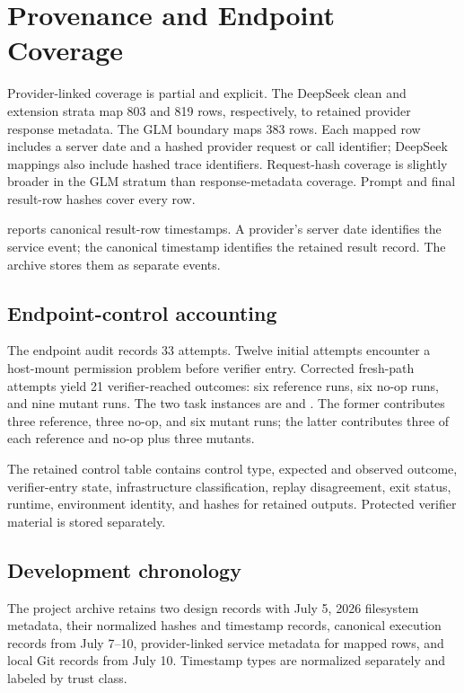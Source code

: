 \section{Provenance and Endpoint Coverage}
\label{app:provenance}



Provider-linked coverage is partial and explicit. The DeepSeek clean and extension strata map 803 and 819 rows, respectively, to retained provider response metadata. The GLM boundary maps 383 rows. Each mapped row includes a server date and a hashed provider request or call identifier; DeepSeek mappings also include hashed trace identifiers. Request-hash coverage is slightly broader in the GLM stratum than response-metadata coverage. Prompt and final result-row hashes cover every row.



 reports canonical result-row timestamps. A provider's server date identifies the service event; the canonical timestamp identifies the retained result record. The archive stores them as separate events.

\subsection{Endpoint-control accounting}

The endpoint audit records 33 attempts. Twelve initial attempts encounter a host-mount permission problem before verifier entry. Corrected fresh-path attempts yield 21 verifier-reached outcomes: six reference runs, six no-op runs, and nine mutant runs. The two task instances are  and . The former contributes three reference, three no-op, and six mutant runs; the latter contributes three of each reference and no-op plus three mutants.

The retained control table contains control type, expected and observed outcome, verifier-entry state, infrastructure classification, replay disagreement, exit status, runtime, environment identity, and hashes for retained outputs. Protected verifier material is stored separately.

\subsection{Development chronology}

The project archive retains two design records with July 5, 2026 filesystem metadata, their normalized hashes and timestamp records, canonical execution records from July 7--10, provider-linked service metadata for mapped rows, and local Git records from July 10. Timestamp types are normalized separately and labeled by trust class.
